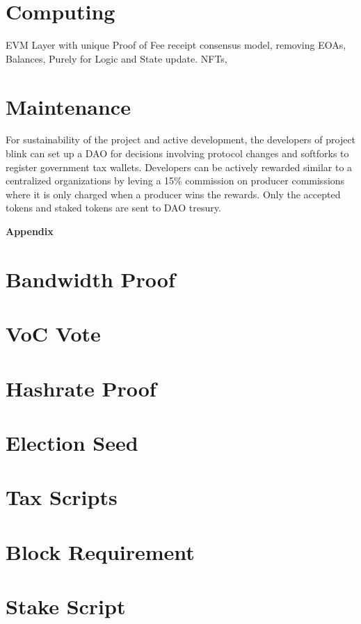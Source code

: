 \documentclass[a4paper,10pt]{article}
\begin{document}
\section{Computing}
EVM Layer with unique Proof of Fee receipt consensus model, removing EOAs, Balances, Purely for Logic and State update. NFTs, 
\section{Maintenance}
For sustainability of the project and active development, the developers of project blink can set up a DAO for decisions involving protocol changes and softforks to register government tax wallets. Developers can be actively rewarded similar to a centralized organizations by leving a 15\% commission on producer commissions where it is only charged when a producer wins the rewards. Only the accepted tokens and staked tokens are sent to DAO tresury.

\appendix

\noindent \Large \textbf{Appendix}

\section{Bandwidth Proof}

\section{VoC Vote}

\section{Hashrate Proof}

\section{Election Seed}

\section{Tax Scripts}

\section{Block Requirement}

\section{Stake Script}
\end{document}
